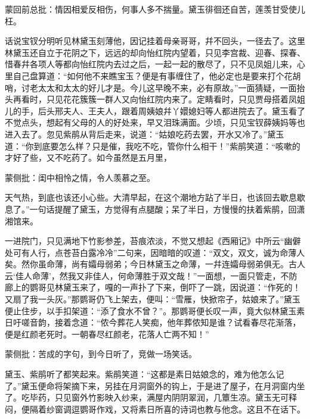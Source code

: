 
\begin{parag}
    \begin{note}蒙回前总批：情因相爱反相伤，何事人多不揣量。黛玉徘徊还自苦，莲羡甘受使儿枉。\end{note}
\end{parag}


\begin{parag}
    话说宝钗分明听见林黛玉刻薄他，因记挂着母亲哥哥，幷不回头，一径去了。这里林黛玉还自立于花阴之下，远远的却向怡红院内望着，只见李宫裁、迎春、探春、惜春幷各项人等都向怡红院内去过之后，一起一起的散尽了，只不见凤姐儿来，心里自己盘算道：“如何他不来瞧宝玉？便是有事缠住了，他必定也是要来打个花胡哨，讨老太太和太太的好儿才是。今儿这早晚不来，必有原故。”一面猜疑，一面抬头再看时，只见花花簇簇一群人又向怡红院内来了。定睛看时，只见贾母搭着凤姐儿的手，后头邢夫人、王夫人，跟着周姨娘幷丫嬛媳妇等人都进院去了。黛玉看了不觉点头，想起有父母的人的好处来，早又泪珠满面。少顷，只见宝钗薛姨妈等也进入去了。忽见紫鹃从背后走来，说道：“姑娘吃药去罢，开水又冷了。”黛玉道：“你到底要怎么样？只是催，我吃不吃，管你什么相干！”紫鹃笑道：“咳嗽的才好了些，又不吃药了。如今虽然是五月里，\begin{note}蒙侧批：闺中相怜之情，令人羡慕之至。\end{note}天气热，到底也该还小心些。大清早起，在这个潮地方跕了半日，也该回去歇息歇息了。”一句话提醒了黛玉，方觉得有点腿酸；呆了半日，方慢慢的扶着紫鹃，回潇湘馆来。
\end{parag}


\begin{parag}
    一进院门，只见满地下竹影参差，苔痕浓淡，不觉又想起《西厢记》中所云“幽僻处可有人行，点苍苔白露冷冷”二句来，因暗暗的叹道：“双文，双文，诚为命薄人矣。然你虽命薄，尚有孀母弱弟；今日林黛玉之命薄，一幷连孀母弱弟俱无。古人云‘佳人命薄’，然我又非佳人，何命薄胜于双文哉！”一面想，一面只管走，不防廊上的鹦哥见林黛玉来了，嘎的一声扑了下来，倒吓了一跳，因说道：“作死的！又扇了我一头灰。”那鹦哥仍飞上架去，便叫：“雪雁，快掀帘子，姑娘来了。”黛玉便止住步，以手扣架道：“添了食水不曾？”。那鹦哥便长叹一声，竟大似林黛玉素日吁嗟音韵，接着念道：“侬今葬花人笑痴，他年葬侬知是谁？试看春尽花渐落，便是红颜老死时。一朝春尽红颜老，花落人亡两不知！”\begin{note}蒙侧批：苦成的字句，到今日听了，竞做一场笑话。\end{note}黛玉、紫鹃听了都笑起来。紫鹃笑道：“这都是素日姑娘念的，难为他怎么记了。”黛玉便命将架摘下来，另挂在月洞窗外的钩上，于是进了屋子，在月洞窗内坐了。吃毕药，只见窗外竹影映入纱来，满屋内阴阴翠润，几簟生凉。黛玉无可释闷，便隔着纱窗调逗鹦哥作戏，又将素日所喜的诗词也教与他念。这且不在话下。
\end{parag}


